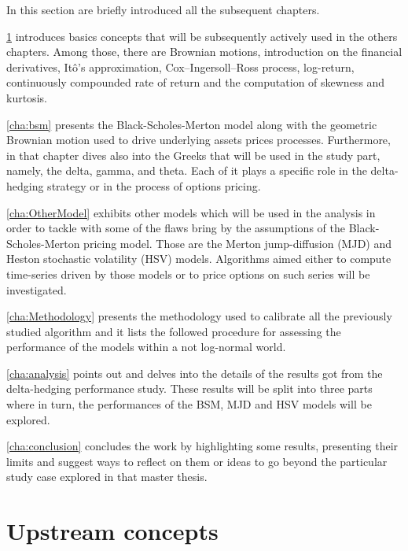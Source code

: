 \documentclass[a4paper, 12pt]{report}
\begin{document}
In this section are briefly introduced all the subsequent chapters.

\cref{cha:upstream} introduces basics concepts that will be subsequently actively used in the others chapters. Among those, there are Brownian motions, introduction on the financial derivatives, Itô's approximation, Cox–Ingersoll–Ross process, log-return, continuously compounded rate of return and the computation of skewness and kurtosis.

\cref{cha:bsm} presents the Black-Scholes-Merton model along with the geometric Brownian motion used to drive underlying assets prices processes. Furthermore, in that chapter dives also into the Greeks that will be used in the study part, namely, the delta, gamma, and theta. Each of it plays a specific role in the delta-hedging strategy or in the process of options pricing.

\cref{cha:OtherModel} exhibits other models which will be used in the analysis in order to tackle with some of the flaws bring by the assumptions of the Black-Scholes-Merton pricing model. Those are the Merton jump-diffusion (MJD) and Heston stochastic volatility (HSV) models. Algorithms aimed either to compute time-series driven by those models or to price options on such series will be investigated.

\cref{cha:Methodology} presents the methodology used to calibrate all the previously studied algorithm and it lists the followed procedure for assessing the performance of the models within a not log-normal world. 

\cref{cha:analysis} points out and delves into the details of the results got from the delta-hedging performance study. These results will be split into three parts where in turn, the performances of the BSM, MJD and HSV models will be explored.

\cref{cha:conclusion} concludes the work by highlighting some results, presenting their limits and suggest ways to reflect on them or ideas to go beyond the particular study case explored in that master thesis.


%
%
\chapter{Upstream concepts}
\label{cha:upstream}


\end{document}
